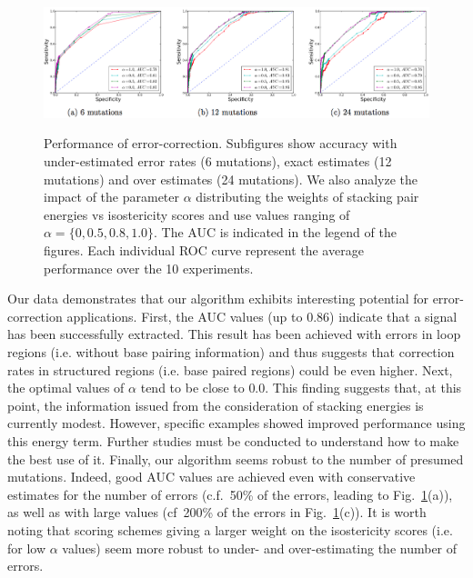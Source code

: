 \begin{figure}
\centering
	\includegraphics[width=\textwidth]{subfigs_perform.png}\\

\caption{Performance of error-correction. Subfigures show accuracy with under-estimated error rates (6 mutations), exact estimates (12 mutations) and over estimates 
(24 mutations). We also analyze the impact of the parameter $\alpha$ distributing the weights of stacking pair energies vs isostericity scores and use values 
ranging of $\alpha=\{0,0.5,0.8,1.0\}$. The AUC is indicated in the legend of the figures. Each individual ROC curve represent the average performance over the 10 experiments.}
\label{fig:ROCall}\SpaceCheating
\end{figure}

Our data demonstrates that our algorithm exhibits interesting potential for error-correction applications. First, the AUC values (up to $0.86$) indicate that a
signal has been successfully extracted. This result has been achieved with errors in loop regions (i.e. without base pairing information) and thus suggests
that correction rates in structured regions (i.e. base paired regions) could be even higher. Next, the optimal values of $\alpha$ tend to be close to $0.0$. This 
finding suggests that, at this point, the information issued from the consideration of stacking energies is currently modest. However, specific examples showed improved performance
using this energy term. Further studies must be conducted to understand how to make the best use of it. Finally, our algorithm seems robust to the number of
presumed mutations. Indeed, good AUC values are achieved even with conservative estimates for the number of errors (c.f.~50\% of the errors, leading to 
Fig.~\ref{fig:ROCall}(a)), as well as with large  values (cf~200\% of the errors  in Fig.~\ref{fig:ROCall}(c)). It is worth noting that scoring schemes giving a larger weight on
the isostericity scores (i.e. for low $\alpha$ values) seem more robust to under- and over-estimating the number of errors.




